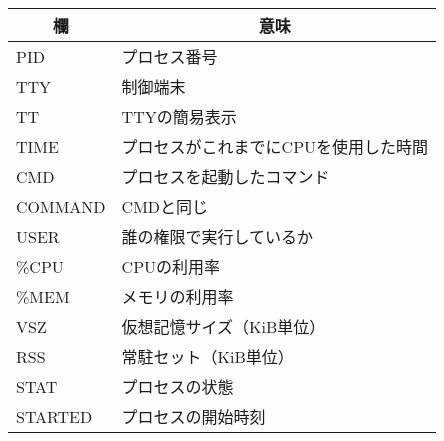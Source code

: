 \documentclass{standalone}
\begin{document}
{\ttfamily
\begin{tabular}{l|l}
\hline\hline
\multicolumn{1}{c}{欄} &
\multicolumn{1}{|c}{意味} \\
\hline
PID     & プロセス番号 \\
TTY     & 制御端末     \\
TT      & TTYの簡易表示 \\
TIME    & プロセスがこれまでにCPUを使用した時間 \\
CMD     & プロセスを起動したコマンド \\
COMMAND & CMDと同じ \\
USER    & 誰の権限で実行しているか \\
\%CPU   & CPUの利用率 \\
\%MEM   & メモリの利用率 \\
VSZ     & 仮想記憶サイズ（KiB単位） \\
RSS     & 常駐セット（KiB単位） \\
STAT    & プロセスの状態 \\
STARTED & プロセスの開始時刻
\end{tabular}}
\end{document}
